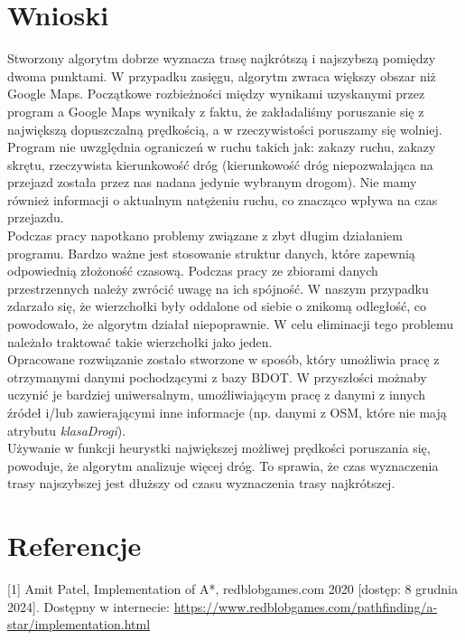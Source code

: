 \documentclass{article}
\begin{document}
\section{Wnioski}
Stworzony algorytm dobrze wyznacza trasę najkrótszą i najszybszą pomiędzy dwoma punktami. W przypadku zasięgu, algorytm zwraca większy obszar niż Google Maps.
Początkowe rozbieżności między wynikami uzyskanymi przez program a Google Maps wynikały z faktu, że zakładaliśmy poruszanie się z największą dopuszczalną prędkością, a w rzeczywistości poruszamy się wolniej.
Program nie uwzględnia ograniczeń w ruchu takich jak: zakazy ruchu, zakazy skrętu, rzeczywista kierunkowość dróg (kierunkowość dróg niepozwalająca na przejazd została przez 
nas nadana jedynie wybranym drogom). Nie mamy również informacji o aktualnym natężeniu ruchu, co znacząco wpływa na czas przejazdu.\\
Podczas pracy napotkano problemy związane z zbyt długim działaniem programu. Bardzo ważne jest stosowanie struktur danych, które zapewnią odpowiednią złożoność czasową. 
Podczas pracy ze zbiorami danych przestrzennych należy zwrócić uwagę na ich spójność. W naszym przypadku zdarzało się, że wierzchołki były oddalone od siebie o znikomą odległość, co powodowało, że algorytm działał niepoprawnie. W celu eliminacji tego problemu należało traktować takie wierzchołki jako jeden.\\
Opracowane rozwiązanie zostało stworzone w sposób, który umożliwia pracę z otrzymanymi danymi pochodzącymi z bazy BDOT. W przyszłości 
możnaby uczynić je bardziej uniwersalnym, umożliwiającym pracę z danymi z innych źródeł i/lub zawierającymi inne informacje (np. danymi z OSM,
które nie mają atrybutu \textit{klasaDrogi}). \\
Używanie w funkcji heurystki największej możliwej prędkości poruszania się, powoduje, że algorytm analizuje więcej dróg. To sprawia, że czas wyznaczenia trasy najszybszej jest dłuższy od czasu wyznaczenia trasy najkrótszej.

\section{Referencje}
[1] Amit Patel, Implementation of A*, redblobgames.com 2020 [dostęp: 8 grudnia 2024]. Dostępny w internecie: \url{https://www.redblobgames.com/pathfinding/a-star/implementation.html}
\end{document}
